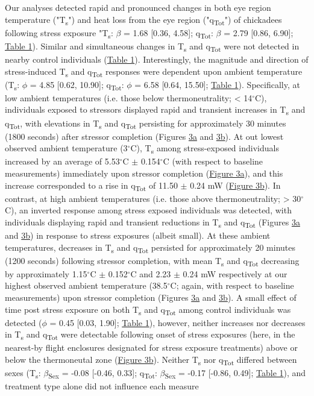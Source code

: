 \documentclass[12pt]{article}
\begin{document}
\noindent Our analyses detected rapid and pronounced changes in both eye region temperature ("T\textsubscript{s}") and heat loss from the eye region ("q\textsubscript{Tot}") of chickadees following stress exposure "T\textsubscript{s}: $\beta$ = 1.68 [0.36, 4.58]; q\textsubscript{Tot}: $\beta$ = 2.79 [0.86, 6.90]; \hyperref[Tab4.1]{Table 1}). Similar and simultaneous changes in T\textsubscript{s} and q\textsubscript{Tot} were not detected in nearby control individuals (\hyperref[Tab4.1]{Table 1}). Interestingly, the magnitude and direction of stress-induced T\textsubscript{s} and q\textsubscript{Tot} responses were dependent upon ambient temperature (T\textsubscript{s}: $\phi$ = 4.85 [0.62, 10.90]; q\textsubscript{Tot}: $\phi$ = 6.58 [0.64, 15.50]; \hyperref[Tab4.1]{Table 1}). Specifically, at low ambient temperatures (i.e. those below thermoneutrality; < 14$^{\circ}$C), individuals exposed to stressors displayed rapid and transient increases in T\textsubscript{s} and q\textsubscript{Tot}, with elevations in T\textsubscript{s} and q\textsubscript{Tot} persisting for approximately 30 minutes (1800 seconds) after stressor completion (Figures \hyperref[Fig4.3]{3a} and \hyperref[Fig4.3]{3b}). At out lowest observed ambient temperature (3$^{\circ}$C), T\textsubscript{s} among stress-exposed individuals increased by an average of 5.53$^{\circ}$C $\pm$ 0.154$^{\circ}$C (with respect to baseline measurements) immediately upon stressor completion (\hyperref[Fig4.3]{Figure 3a}), and this increase corresponded to a rise in q\textsubscript{Tot} of 11.50 $\pm$ 0.24 mW (\hyperref[Fig4.3]{Figure 3b}). In contrast, at high ambient temperatures (i.e. those above thermoneutrality; > 30$^{\circ}$C), an inverted response among stress exposed individuals was detected, with individuals displaying rapid and transient reductions in T\textsubscript{s} and q\textsubscript{Tot} (Figures \hyperref[Fig4.3]{3a} and \hyperref[Fig4.3]{3b}) in response to stress exposures (albeit small). At these ambient temperatures, decreases in T\textsubscript{s} and q\textsubscript{Tot} persisted for approximately 20 minutes (1200 seconds) following stressor completion, with mean T\textsubscript{s} and q\textsubscript{Tot} decreasing by approximately 1.15$^{\circ}$C $\pm$ 0.152$^{\circ}$C and 2.23 $\pm$ 0.24 mW respectively at our highest observed ambient temperature (38.5$^{\circ}$C; again, with respect to baseline measurements) upon stressor completion (Figures \hyperref[Fig4.3]{3a} and \hyperref[Fig4.3]{3b}). A small effect of time post stress exposure on both T\textsubscript{s} and q\textsubscript{Tot} among control individuals was detected ($\phi$ = 0.45 [0.03, 1.90]; \hyperref[Tab4.1]{Table 1}), however, neither increases nor decreases in T\textsubscript{s} and q\textsubscript{Tot} were detectable following onset of stress exposures (here, in the nearest-by flight enclosures designated for stress exposure treatments) above or below the thermoneutal zone (\hyperref[Fig4.3]{Figure 3b}). Neither T\textsubscript{s} nor q\textsubscript{Tot} differed between sexes (T\textsubscript{s}: $\beta$\textsubscript{Sex} = -0.08 [-0.46, 0.33]; q\textsubscript{Tot}: $\beta$\textsubscript{Sex} = -0.17 [-0.86, 0.49]; \hyperref[Tab4.1]{Table 1}), and treatment type alone did not influence each measure 
\end{document}

